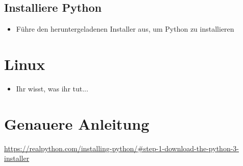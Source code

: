 \documentclass[accentcolor=3c,colorbacktitle,12pt]{tudaexercise}
\begin{document}
\subsection*{Installiere Python}
\begin{itemize}
    \item Führe den heruntergeladenen Installer aus, um Python zu installieren
\end{itemize}

\section*{Linux}
\begin{itemize}
    \item Ihr wisst, was ihr tut...
\end{itemize}

\section*{Genauere Anleitung}
\url{https://realpython.com/installing-python/#step-1-download-the-python-3-installer}
\end{document}
